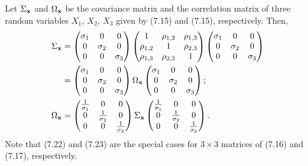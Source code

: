 Let $\Sigma_{\mathbf{x}}$ and $\Omega_{\mathbf{x}}$ be the covariance matrix and the correlation
matrix of three random variables $X_1$, $X_2$, $X_3$ given by (7.15) and (7.15),
respectively. Then,
\begin{align}
\Sigma_{\mathbf{x}} &= \begin{pmatrix} \sigma_1 & 0 & 0 \\ 0 & \sigma_2 & 0 \\ 0 & 0 & \sigma_3 \end{pmatrix}
\begin{pmatrix} 1 & \rho_{1,2} & \rho_{1,3} \\ \rho_{1,2} & 1 & \rho_{2,3} \\ \rho_{1,3} & \rho_{2,3} & 1 \end{pmatrix}
\begin{pmatrix} \sigma_1 & 0 & 0 \\ 0 & \sigma_2 & 0 \\ 0 & 0 & \sigma_3 \end{pmatrix} \notag \\
&= \begin{pmatrix} \sigma_1 & 0 & 0 \\ 0 & \sigma_2 & 0 \\ 0 & 0 & \sigma_3 \end{pmatrix}
\Omega_{\mathbf{x}}
\begin{pmatrix} \sigma_1 & 0 & 0 \\ 0 & \sigma_2 & 0 \\ 0 & 0 & \sigma_3 \end{pmatrix}; \\
\Omega_{\mathbf{x}} &= \begin{pmatrix} \frac{1}{\sigma_1} & 0 & 0 \\ 0 & \frac{1}{\sigma_2} & 0 \\ 0 & 0 & \frac{1}{\sigma_3} \end{pmatrix}
\Sigma_{\mathbf{x}}
\begin{pmatrix} \frac{1}{\sigma_1} & 0 & 0 \\ 0 & \frac{1}{\sigma_2} & 0 \\ 0 & 0 & \frac{1}{\sigma_3} \end{pmatrix}.
\end{align}
Note that (7.22) and (7.23) are the special cases for $3\times 3$ matrices of (7.16)
and (7.17), respectively.

